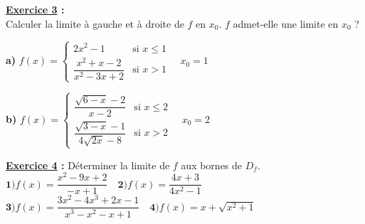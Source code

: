 \documentclass[12pt,a4paper]{article}
\begin{document}
\begin{multicols}{2}
\textbf{\underline{Exercice 3} :} \\
Calculer la limite à gauche et à droite de \( f \) en \( x_0 \). \( f \) admet-elle une limite en \( x_0 \) ?

\textbf{a)} \( f(x) = 
\begin{cases}
2x^2 - 1 & \text{si } x \leq 1 \\
\dfrac{x^2 + x - 2}{x^2 - 3x + 2} & \text{si } x > 1
\end{cases} 
\quad x_0 = 1 \)

\textbf{b)} \( f(x) = 
\begin{cases}
\dfrac{\sqrt{6 - x} - 2}{x - 2} & \text{si } x \leq 2 \\
\dfrac{\sqrt{3 - x} - 1}{4\sqrt{2x} - 8} & \text{si } x > 2
\end{cases} 
\quad x_0 = 2 \)

\textbf{\underline{Exercice 4} :} Déterminer la limite de \( f \) aux bornes de \( D_f \).
   \(\textbf{1)} f(x)=\dfrac{x^2 - 9x + 2}{-x + 1}\quad \textbf{2)} f(x) = \dfrac{4x + 3}{4x^2 - 1}\)
  \(\textbf{3)} f(x) = \dfrac{3x^2 - 4x^3 + 2x - 1}{x^3 - x^2 - x + 1}\quad \textbf{4)} f(x) = x + \sqrt{x^2 + 1}\)


\end{multicols}
\end{document}

